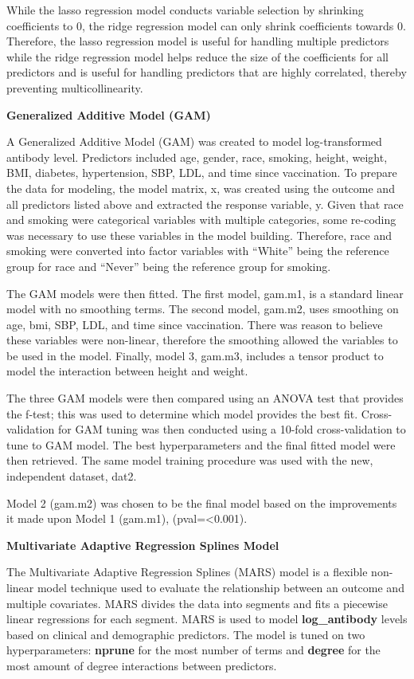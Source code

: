 \documentclass[
]{article}
\begin{document}
While the lasso regression model conducts variable selection by
shrinking coefficients to 0, the ridge regression model can only shrink
coefficients towards 0. Therefore, the lasso regression model is useful
for handling multiple predictors while the ridge regression model helps
reduce the size of the coefficients for all predictors and is useful for
handling predictors that are highly correlated, thereby preventing
multicollinearity.

\textbf{Generalized Additive Model (GAM)}

A Generalized Additive Model (GAM) was created to model log-transformed
antibody level. Predictors included age, gender, race, smoking, height,
weight, BMI, diabetes, hypertension, SBP, LDL, and time since
vaccination. To prepare the data for modeling, the model matrix, x, was
created using the outcome and all predictors listed above and extracted
the response variable, y. Given that race and smoking were categorical
variables with multiple categories, some re-coding was necessary to use
these variables in the model building. Therefore, race and smoking were
converted into factor variables with ``White'' being the reference group
for race and ``Never'' being the reference group for smoking.

The GAM models were then fitted. The first model, gam.m1, is a standard
linear model with no smoothing terms. The second model, gam.m2, uses
smoothing on age, bmi, SBP, LDL, and time since vaccination. There was
reason to believe these variables were non-linear, therefore the
smoothing allowed the variables to be used in the model. Finally, model
3, gam.m3, includes a tensor product to model the interaction between
height and weight.

The three GAM models were then compared using an ANOVA test that
provides the f-test; this was used to determine which model provides the
best fit. Cross-validation for GAM tuning was then conducted using a
10-fold cross-validation to tune to GAM model. The best hyperparameters
and the final fitted model were then retrieved. The same model training
procedure was used with the new, independent dataset, dat2.

Model 2 (gam.m2) was chosen to be the final model based on the
improvements it made upon Model 1 (gam.m1), (pval=\textless0.001).

\textbf{Multivariate Adaptive Regression Splines Model}

The Multivariate Adaptive Regression Splines (MARS) model is a flexible
non-linear model technique used to evaluate the relationship between an
outcome and multiple covariates. MARS divides the data into segments and
fits a piecewise linear regressions for each segment. MARS is used to
model \textbf{log\_antibody} levels based on clinical and demographic
predictors. The model is tuned on two hyperparameters: \textbf{nprune}
for the most number of terms and \textbf{degree} for the most amount of
degree interactions between predictors.
\end{document}
